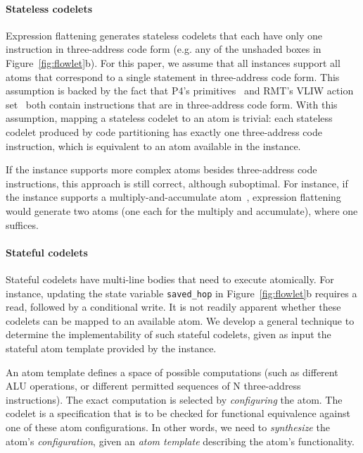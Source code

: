 \paragraph{Stateless codelets}
Expression flattening generates stateless codelets that each have only one
instruction in three-address code form (e.g. any of the unshaded boxes in
Figure~\ref{fig:flowlet}b). For this paper, we assume that all \absmachine
instances support all atoms that correspond to a single statement in
three-address code form. This assumption is backed by the fact that P4's
primitives~\cite{p4spec} and RMT's VLIW action set~\cite{rmt} both contain
instructions that are in three-address code form. With this assumption, mapping
a stateless codelet to an atom is trivial: each stateless codelet produced by
code partitioning has exactly one three-address code instruction, which is
equivalent to an atom available in the \absmachine instance.

If the \absmachine instance supports more complex atoms besides three-address
code instructions, this approach is still correct, although suboptimal. For
instance, if the \absmachine instance supports a multiply-and-accumulate
atom~\cite{mac}, expression flattening would generate two atoms (one each for
the multiply and accumulate), where one suffices.

\paragraph{Stateful codelets}
Stateful codelets have multi-line bodies that need to execute atomically. For
instance, updating the state variable \texttt{saved\_hop} in
Figure~\ref{fig:flowlet}b requires a read, followed by a conditional write.  It
is not readily apparent whether these codelets can be mapped to an available
atom. We develop a general technique to determine the implementability of such
stateful codelets, given as input the stateful atom template provided by the
\absmachine instance.

An atom template defines a space of possible computations (such as different
ALU operations, or different permitted sequences of N three-address
instructions).  The exact computation is selected by \textit{configuring} the
atom. The codelet is a specification that is to be checked for functional
equivalence against one of these atom configurations. In other words, we need
to \textit{synthesize} the atom's \textit{configuration}, given an \textit{atom
template} describing the atom's functionality.

